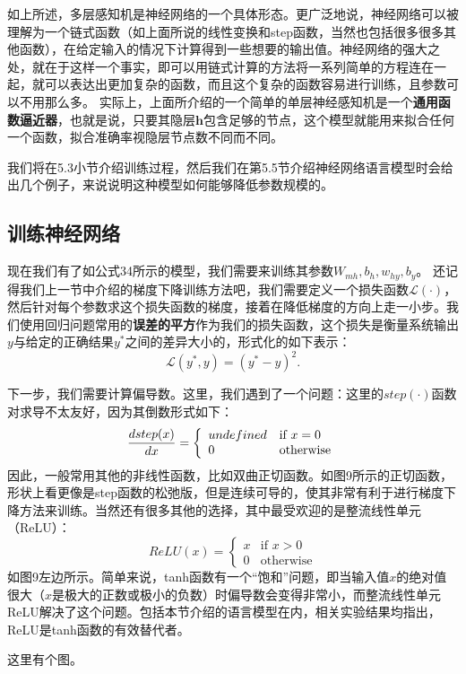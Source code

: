 \documentclass[10pt,a4paper]{ctexart}
\begin{document}
如上所述，多层感知机是神经网络的一个具体形态。更广泛地说，神经网络可以被理解为一个链式函数（如上面所说的线性变换和step函数，当然也包括很多很多其他函数），在给定输入的情况下计算得到一些想要的输出值。神经网络的强大之处，就在于这样一个事实，即可以用链式计算的方法将一系列简单的方程连在一起，就可以表达出更加复杂的函数，而且这个复杂的函数容易进行训练，且参数可以不用那么多。
实际上，上面所介绍的一个简单的单层神经感知机是一个\textbf{通用函数逼近器}，也就是说，只要其隐层$\textbf{h}$包含足够的节点，这个模型就能用来拟合任何一个函数，拟合准确率视隐层节点数不同而不同。

我们将在5.3小节介绍训练过程，然后我们在第5.5节介绍神经网络语言模型时会给出几个例子，来说说明这种模型如何能够降低参数规模的。
\subsection{训练神经网络}
现在我们有了如公式34所示的模型，我们需要来训练其参数$W_{mh},b_{h},w_{hy},b_y$。
还记得我们上一节中介绍的梯度下降训练方法吧，我们需要定义一个损失函数$\mathcal{L}(\cdot)$，然后针对每个参数求这个损失函数的梯度，接着在降低梯度的方向上走一小步。我们使用回归问题常用的\textbf{误差的平方}作为我们的损失函数，这个损失是衡量系统输出$y$与给定的正确结果$y^*$之间的差异大小的，形式化的如下表示：
\[
 \mathcal{L}(y^*,y) = (y^* - y)^2.
\]

下一步，我们需要计算偏导数。这里，我们遇到了一个问题：这里的$step(\cdot)$函数对求导不太友好，因为其倒数形式如下：
\[
 \frac{\mathnormal{d}step(x)}{\mathnormal{d}x} = \left\{ \begin{array}{ll}
  undefined & \textrm{if $x = 0$} \\
  0 & \textrm{otherwise}
  \end{array} \right.
\]
因此，一般常用其他的非线性函数，比如双曲正切函数。如图9所示的正切函数，形状上看更像是step函数的松弛版，但是连续可导的，使其非常有利于进行梯度下降方法来训练。当然还有很多其他的选择，其中最受欢迎的是整流线性单元（ReLU）：
\[
 ReLU(x) = \left\{ \begin{array}{ll}
  x & \textrm{if $x > 0$} \\
  0 & \textrm{otherwise}
  \end{array} \right.
\]
如图9左边所示。简单来说，tanh函数有一个“饱和”问题，即当输入值$x$的绝对值很大（$x$是极大的正数或极小的负数）时偏导数会变得非常小，而整流线性单元ReLU解决了这个问题。包括本节介绍的语言模型在内，相关实验结果均指出，ReLU是tanh函数的有效替代者。

这里有个图。
\end{document}
